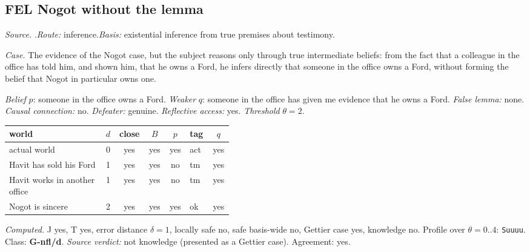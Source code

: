 \subsection*{FEL \enspace Nogot without the lemma}
\noindent\textit{Source.} \citet{Feldman1974}.\quad \textit{Route:} inference.\quad \textit{Basis:} existential inference from true premises about testimony.\par
\noindent\textit{Case.} The evidence of the Nogot case, but the subject reasons only through true intermediate beliefs: from the fact that a colleague in the office has told him, and shown him, that he owns a Ford, he infers directly that someone in the office owns a Ford, without forming the belief that Nogot in particular owns one.\par
\noindent\textit{Belief} $p$: someone in the office owns a Ford.
 \textit{Weaker} $q$: someone in the office has given me evidence that he owns a Ford.
 \textit{False lemma:} none. \textit{Causal connection:} no. \textit{Defeater:} genuine. \textit{Reflective access:} yes. \textit{Threshold} $\theta = 2$.\par
\begin{center}\begin{tabular}{@{}p{0.43\linewidth}rccclc@{}}
world & $d$ & close & $B$ & $p$ & tag & $q$ \\ \midrule
actual world & 0 & yes & yes & yes & act & yes \\
Havit has sold his Ford & 1 & yes & yes & no & tm & yes \\
Havit works in another office & 1 & yes & yes & no & tm & yes \\
Nogot is sincere & 2 & yes & yes & yes & ok & yes \\
\end{tabular}\end{center}
\noindent\textit{Computed.} J yes, T yes, error distance $\delta = 1$, locally safe no, safe basis-wide no, Gettier case yes, knowledge no. Profile over $\theta = 0..4$: \texttt{Suuuu}. Class: \textbf{G-nfl/d}.
 \textit{Source verdict:} not knowledge (presented as a Gettier case). Agreement: yes.
\par\medskip
{}
